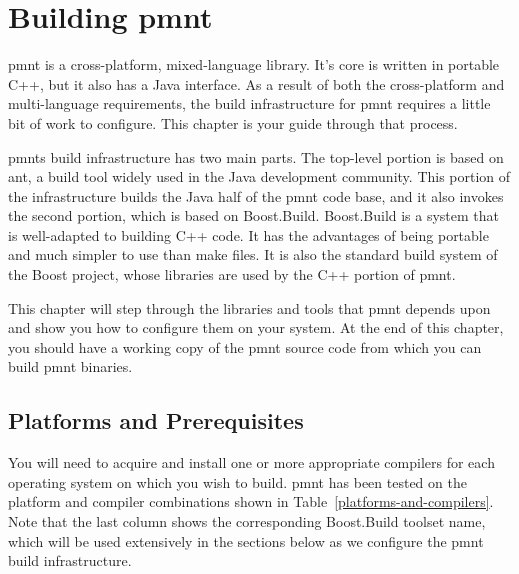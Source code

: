 
\chapter{Building \acl{pmnt}}
\label{chapter-building-parliament}

\ac{pmnt} is a cross-platform, mixed-language library.  It's core is written in portable C++, but it also has a Java interface.  As a result of both the cross-platform and multi-language requirements, the build infrastructure for \ac{pmnt} requires a little bit of work to configure.  This chapter is your guide through that process.

\acp{pmnt} build infrastructure has two main parts.  The top-level portion is based on ant, a build tool widely used in the Java development community.  This portion of the infrastructure builds the Java half of the \ac{pmnt} code base, and it also invokes the second portion, which is based on Boost.Build.  Boost.Build is a system that is well-adapted to building C++ code.  It has the advantages of being portable and much simpler to use than make files.  It is also the standard build system of the Boost project, whose libraries are used by the C++ portion of \ac{pmnt}.

This chapter will step through the libraries and tools that \ac{pmnt} depends upon and show you how to configure them on your system.  At the end of this chapter, you should have a working copy of the \ac{pmnt} source code from which you can build \ac{pmnt} binaries.

\section{Platforms and Prerequisites}

You will need to acquire and install one or more appropriate compilers for each operating system on which you wish to build.  \ac{pmnt} has been tested on the platform and compiler combinations shown in Table~\ref{platforms-and-compilers}.  Note that the last column shows the corresponding Boost.Build toolset name, which will be used extensively in the sections below as we configure the \ac{pmnt} build infrastructure.

